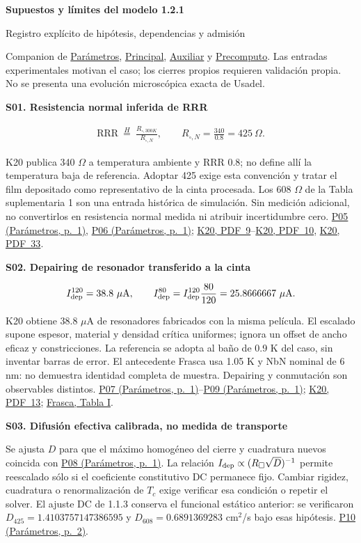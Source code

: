 \documentclass[11pt,a4paper]{article}
\newcommand{\block}[1]{\par\vspace{6pt}{\large\bfseries\color{ink}#1}\par\vspace{3pt}}
\newcommand{\K}[1]{\href{https://eprints.lancs.ac.uk/id/eprint/140252/3/Binder1.pdf\#page=#1}{K20, PDF~#1}}
\newcommand{\pref}[2]{\href{Parametros.pdf\#nameddest=#1}{#1 (Parámetros, p.~#2)}}
\newcommand{\assumption}[2]{\par\vspace{6pt}\hypertarget{#1}{\textbf{\color{ink}#1. #2}}\par}
\newcommand{\smallnote}[1]{{\small #1\par}}
\begin{document}
{\LARGE\bfseries\color{ink}Supuestos y límites del modelo 1.2.1}\par
{\large Registro explícito de hipótesis, dependencias y admisión}\par
\smallnote{Companion de \href{Parametros.pdf}{Parámetros}, \href{Principal.pdf}{Principal}, \href{Auxiliar.pdf}{Auxiliar} y \href{Precomputo.pdf}{Precomputo}. Las entradas experimentales motivan el caso; los cierres propios requieren validación propia. No se presenta una evolución microscópica exacta de Usadel.}
\block{Material y calibración estática}
\assumption{S01}{Resistencia normal inferida de RRR}
\begin{gather*}
 \mathrm{RRR}\ \overset{H}{=}\ \frac{R_{\square,300K}}{R_{\square,N}},
 \qquad R_{\square,N}=\frac{340}{0.8}=425\ \Omega .
\end{gather*}
\smallnote{K20 publica 340 $\Omega$ a temperatura ambiente y RRR 0.8; no define allí la temperatura baja de referencia. Adoptar 425 exige esta convención y tratar el film depositado como representativo de la cinta procesada. Los 608 $\Omega$ de la Tabla suplementaria 1 son una entrada histórica de simulación. Sin medición adicional, no convertirlos en resistencia normal medida ni atribuir incertidumbre cero. \pref{P05}{1}, \pref{P06}{1}; \K{9}--\K{10}, \K{33}.}
\assumption{S02}{Depairing de resonador transferido a la cinta}
\begin{gather*}
 I_{\rm dep}^{120}=38.8\ \mu{\rm A},\qquad
 I_{\rm dep}^{80}=I_{\rm dep}^{120}\frac{80}{120}
 =25.8666667\ \mu{\rm A}.
\end{gather*}
\smallnote{K20 obtiene 38.8 $\mu$A de resonadores fabricados con la misma película. El escalado supone espesor, material y densidad crítica uniformes; ignora un offset de ancho eficaz y constricciones. La referencia se adopta al baño de 0.9 K del caso, sin inventar barras de error. El antecedente Frasca usa 1.05 K y NbN nominal de 6 nm: no demuestra identidad completa de muestra. Depairing y conmutación son observables distintos. \pref{P07}{1}--\pref{P09}{1}; \K{13}; \href{https://arxiv.org/pdf/1904.08596\#page=6}{Frasca, Tabla I}.}
\assumption{S03}{Difusión efectiva calibrada, no medida de transporte}
\smallnote{Se ajusta $D$ para que el máximo homogéneo del cierre y cuadratura nuevos coincida con \pref{P08}{1}. La relación $I_{\rm dep}\propto(R_\square\sqrt D)^{-1}$ permite reescalado sólo si el coeficiente constitutivo DC permanece fijo. Cambiar rigidez, cuadratura o renormalización de $T_c$ exige verificar esa condición o repetir el solver. El ajuste DC de 1.1.3 conserva el funcional estático anterior: se verificaron $D_{425}=1.4103757147386595$ y $D_{608}=0.6891369283$ cm$^2$/s bajo esas hipótesis. \pref{P10}{2}.}
\end{document}
